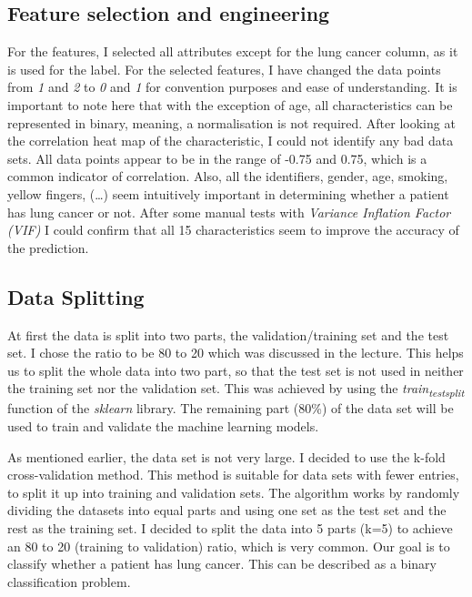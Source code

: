 \documentclass[a4paper,12pt]{article}
\begin{document}
\subsection{Feature selection and engineering}
\label{sec:orgc1ca326}
For the features, I selected all attributes except for the lung cancer column, as it is used for the label.
For the selected features, I have changed the data points from \emph{1} and \emph{2} to \emph{0} and \emph{1} for convention purposes and ease of understanding.
It is important to note here that with the exception of age, all characteristics can be represented in binary, meaning, a normalisation is not required.
After looking at the correlation heat map of the characteristic, I could not identify any bad data sets. All data points appear to be in the range of -0.75 and 0.75, which is a common indicator of correlation.
Also, all the identifiers, gender, age, smoking, yellow fingers, (\ldots{}) seem intuitively important in determining whether a patient has lung cancer or not.
After some manual tests with \emph{Variance Inflation Factor (VIF)} I could confirm that all 15 characteristics seem to improve the accuracy of the prediction.

\subsection{Data Splitting}
\label{sec:org9c9a9b3}
At first the data is split into two parts, the validation/training set and the test set. I chose the ratio to be 80 to 20 which was discussed in the lecture.
This helps us to split the whole data into two part, so that the test set is not used in neither the training set nor the validation set.
This was achieved by using the \emph{train\textsubscript{test}\textsubscript{split}} function of the \emph{sklearn} library.
The remaining part (80\%) of the data set will be used to train and validate the machine learning models.

As mentioned earlier, the data set is not very large.
I decided to use the k-fold cross-validation method. This method is suitable for data sets with fewer entries, to split it up into training and validation sets.
The algorithm works by randomly dividing the datasets into equal parts and using one set as the test set and the rest as the training set.
I decided to split the data into 5 parts (k=5) to achieve an 80 to 20 (training to validation) ratio, which is very common.
Our goal is to classify whether a patient has lung cancer. This can be described as a binary classification problem.
\end{document}
